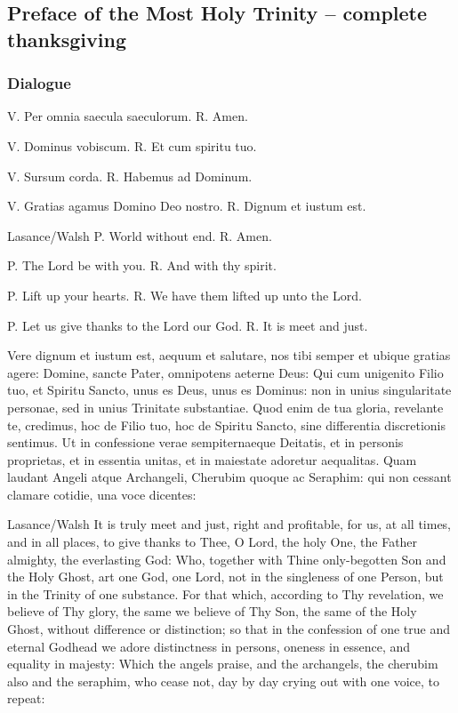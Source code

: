 \subsection{Preface of the Most Holy Trinity -- complete thanksgiving}
\label{proper-preface}

\subsubsection{Dialogue}
\begin{latinproper}
V. Per omnia saecula saeculorum. R. Amen.

V. Dominus vobiscum. R. Et cum spiritu tuo.

V. Sursum corda. R. Habemus ad Dominum.

V. Gratias agamus Domino Deo nostro. R. Dignum et iustum est.
\end{latinproper}

\begin{englishwitness}{Lasance/Walsh}
P. World without end. R. Amen.

P. The Lord be with you. R. And with thy spirit.

P. Lift up your hearts. R. We have them lifted up unto the Lord.

P. Let us give thanks to the Lord our God. R. It is meet and just.
\end{englishwitness}

\begin{latinproper}
Vere dignum et iustum est, aequum et salutare, nos tibi semper et ubique
gratias agere: Domine, sancte Pater, omnipotens aeterne Deus: Qui cum
unigenito Filio tuo, et Spiritu Sancto, unus es Deus, unus es Dominus:
non in unius singularitate personae, sed in unius Trinitate substantiae.
Quod enim de tua gloria, revelante te, credimus, hoc de Filio tuo, hoc
de Spiritu Sancto, sine differentia discretionis sentimus. Ut in
confessione verae sempiternaeque Deitatis, et in personis proprietas,
et in essentia unitas, et in maiestate adoretur aequalitas. Quam laudant
Angeli atque Archangeli, Cherubim quoque ac Seraphim: qui non cessant
clamare cotidie, una voce dicentes:
\end{latinproper}

\begin{englishwitness}{Lasance/Walsh}
It is truly meet and just, right and profitable, for us, at all times, and
in all places, to give thanks to Thee, O Lord, the holy One, the Father
almighty, the everlasting God: Who, together with Thine only-begotten Son
and the Holy Ghost, art one God, one Lord, not in the singleness of one
Person, but in the Trinity of one substance. For that which, according to
Thy revelation, we believe of Thy glory, the same we believe of Thy Son,
the same of the Holy Ghost, without difference or distinction; so that
in the confession of one true and eternal Godhead we adore distinctness
in persons, oneness in essence, and equality in majesty: Which the angels
praise, and the archangels, the cherubim also and the seraphim, who cease
not, day by day crying out with one voice, to repeat:
\end{englishwitness}

